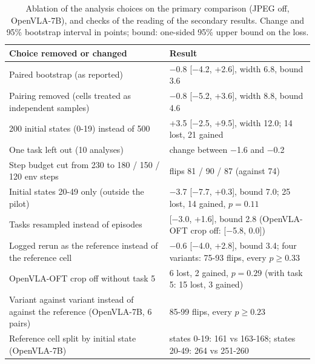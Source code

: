 \begin{table}[t]
\caption{Ablation of the analysis choices on the primary comparison (JPEG off, OpenVLA-7B), and checks of the reading of the secondary results. Change and 95\% bootstrap interval in points; bound: one-sided 95\% upper bound on the loss.}
\label{tab:ablation}
\centering
\footnotesize
\setlength{\tabcolsep}{3pt}
\begin{tabular}{@{}L{0.45\columnwidth}L{0.49\columnwidth}@{}}
\toprule
Choice removed or changed & Result \\
\midrule
Paired bootstrap (as reported) & $-$0.8 [$-$4.2, +2.6], width 6.8, bound 3.6 \\
Pairing removed (cells treated as independent samples) & $-$0.8 [$-$5.2, +3.6], width 8.8, bound 4.6 \\
200 initial states (0-19) instead of 500 & +3.5 [$-$2.5, +9.5], width 12.0; 14 lost, 21 gained \\
One task left out (10 analyses) & change between $-$1.6 and $-$0.2 \\
Step budget cut from 230 to 180 / 150 / 120 env steps & flips 81 / 90 / 87 (against 74) \\
Initial states 20-49 only (outside the pilot) & $-$3.7 [$-$7.7, +0.3], bound 7.0; 25 lost, 14 gained, $p = 0.11$ \\
Tasks resampled instead of episodes & [$-$3.0, +1.6], bound 2.8 (OpenVLA-OFT crop off: [$-$5.8, 0.0]) \\
Logged rerun as the reference instead of the reference cell & $-$0.6 [$-$4.0, +2.8], bound 3.4; four variants: 75-93 flips, every $p \geq 0.33$ \\
\midrule
OpenVLA-OFT crop off without task 5 & 6 lost, 2 gained, $p = 0.29$ (with task 5: 15 lost, 3 gained) \\
Variant against variant instead of against the reference (OpenVLA-7B, 6 pairs) & 85-99 flips, every $p \geq 0.23$ \\
Reference cell split by initial state (OpenVLA-7B) & states 0-19: 161 vs 163-168; states 20-49: 264 vs 251-260 \\
\bottomrule
\end{tabular}
\end{table}
